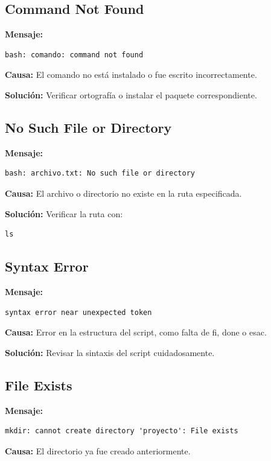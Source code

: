 \documentclass[12pt,a4paper]{article}
\begin{document}
\subsection{Command Not Found}

\textbf{Mensaje:}
\begin{lstlisting}
bash: comando: command not found
\end{lstlisting}

\textbf{Causa:}  
El comando no está instalado o fue escrito incorrectamente.

\textbf{Solución:}
Verificar ortografía o instalar el paquete correspondiente.


\subsection{No Such File or Directory}

\textbf{Mensaje:}
\begin{lstlisting}
bash: archivo.txt: No such file or directory
\end{lstlisting}

\textbf{Causa:}  
El archivo o directorio no existe en la ruta especificada.

\textbf{Solución:}
Verificar la ruta con:
\begin{lstlisting}
ls
\end{lstlisting}


\subsection{Syntax Error}

\textbf{Mensaje:}
\begin{lstlisting}
syntax error near unexpected token
\end{lstlisting}

\textbf{Causa:}  
Error en la estructura del script, como falta de fi, done o esac.

\textbf{Solución:}
Revisar la sintaxis del script cuidadosamente.


\subsection{File Exists}

\textbf{Mensaje:}
\begin{lstlisting}
mkdir: cannot create directory 'proyecto': File exists
\end{lstlisting}

\textbf{Causa:}  
El directorio ya fue creado anteriormente.
\end{document}
